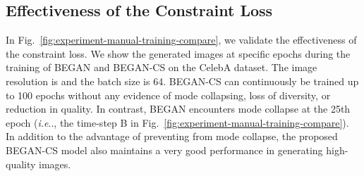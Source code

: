 \documentclass[runningheads]{llncs}
\makeatletter
\DeclareRobustCommand\onedot{\futurelet\@let@token\@onedot}
\def\@onedot{\ifx\@let@token.\else.\null\fi\xspace}
\def\ie{\emph{i.e}\onedot} \def\Ie{\emph{I.e}\onedot}
\makeatother
\begin{document}
    \subsection{Effectiveness of the Constraint Loss}
    
    In Fig.~\ref{fig:experiment-manual-training-compare}, we validate the effectiveness of the constraint loss. We show the generated images at specific epochs during the training of BEGAN and BEGAN-CS on the CelebA dataset. The image resolution is  and the batch size is 64.  BEGAN-CS can continuously be trained up to 100 epochs without any evidence of mode collapsing, loss of diversity, or reduction in quality. In contrast, BEGAN encounters mode collapse at the 25th epoch (\ie, the time-step {\sf B} in Fig.~\ref{fig:experiment-manual-training-compare}). In addition to the advantage of preventing from mode collapse, the proposed BEGAN-CS model also maintains a very good performance in generating high-quality images.
    
    
    
\end{document}
